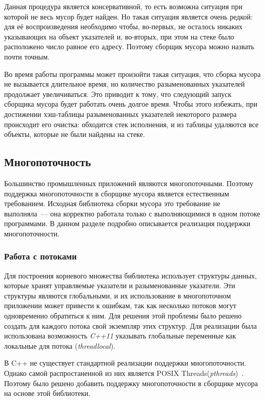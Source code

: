 Данная процедура является консервативной, то есть возможна ситуация при которой не весь мусор будет найден. Но такая ситуация является очень редкой: для её воспроизведения необходимо чтобы, во-первых, не осталось никаких указывающих на объект указателей и, во-вторых, при этом на стеке было расположено число равное его адресу. Поэтому сборщик мусора можно назвать почти точным.

Во время работы программы может произойти такая ситуация, что сборка мусора не вызывается длительное время, но количество разыменованных указателей продолжает увеличиваться. Это приводит к тому, что следующий запуск сборщика мусора будет работать очень долгое время. Чтобы этого избежать, при достижении хэш-таблицы разыменованных указателей некоторого размера происходит его очистка: обходится стек исполнения, и из таблицы удаляются все объекты, которые не были найдены на стеке.
\subsection{Многопоточность}
Большинство промышленных приложений являются многопоточными. Поэтому поддержка многопоточности в сборщике мусора является естественным требованием. Исходная библиотека сборки мусора это требование не выполняла~--- она корректно работала только с выполняющимися в одном потоке программами. В данном разделе подробно описывается реализация поддержки многопоточности.

\subsubsection{Работа с потоками}
Для построения корневого множества библиотека использует структуры данных, которые
хранят управляемые указатели и разыменованные указатели. Эти структуры являются глобальными, и их использование в многопоточном приложении может привести к ошибкам, так как несколько потоков могут одновременно обратиться к ним.
Для решения этой проблемы было решено создать для каждого потока свой экземпляр этих структур. Для реализации была использована возможность \textit{C++11} указывать
глобальные переменные как локальные для потока (\textit{threadlocal}).

В C++ не существует стандартной реализации поддержки многопоточности. 
Однако самой распростаненной из них является POSIX Threads(\textit{pthreads})~\cite{pthreads}. Поэтому было решено добавить поддержку многопоточности в сборщике мусора на основе этой библиотеки.

